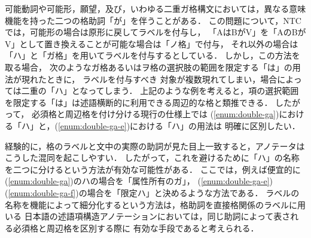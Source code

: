 \documentclass[japanese]{jnlp_1.4}
\begin{document}
可能動詞や可能形，願望，及び，いわゆる二重ガ格構文においては，異なる意味機能を持った二つの格助詞「が」を伴うことがある．
この問題について，NTCでは，可能形の場合は原形に戻してラベルを付与し，
「AはBがV」を「AのBがV」として置き換えることが可能な場合は「ノ格」で付与，
それ以外の場合は「ハ」と「ガ格」を用いてラベルを付与するとしている．
しかし，この方法を取る場合，
次のようなガ格あるいはヲ格の選択肢の範囲を限定する「は」の用法が現れたときに，
ラベルを付与すべき
対象が複数現れてしまい，場合によっては二重の「ハ」となってしまう．
上記のような例を考えると，項の選択範囲を限定する「は」は述語横断的に利用できる周辺的な格と類推できる．
したがって，
必須格と周辺格を付け分ける現行の仕様上では
(\ref{enum:double-ga})における「ハ」と，(\ref{enum:double-ga-e})における「ハ」の用法は
明確に区別したい．

経験的に，格のラベルと文中の実際の助詞が見た目上一致すると，アノテータは
こうした混同を起こしやすい．
したがって，これを避けるために「ハ」の名称を二つに分けるという方法が有効な可能性がある．
ここでは，例えば便宜的に(\ref{enum:double-ga})のハの場合を「属性所有のガ」，
(\ref{enum:double-ga-e})(\ref{enum:double-ga-f})の場合を「限定ハ」と決めるような方法である．
ラベルの名称を機能によって細分化するという方法は，格助詞を直接格関係のラベルに用いる
日本語の述語項構造アノテーションにおいては，同じ助詞によって表される必須格と周辺格を区別する際に
有効な手段であると考えられる．
\end{document}
